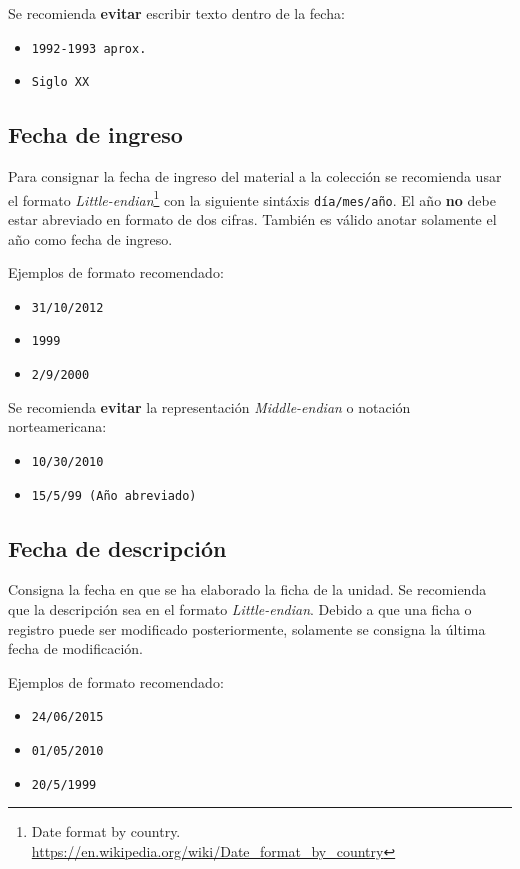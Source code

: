 \documentclass[10pt,letterpaper]{article}
\begin{document}
Se recomienda \textbf{evitar} escribir texto dentro de la fecha:
{\color{Red}
\begin{itemize}
	\item \texttt{1992-1993 aprox.}
	\item \texttt{Siglo XX}
\end{itemize}
}

\subsection{Fecha de ingreso}
Para consignar la fecha de ingreso del material a la colección se recomienda usar el formato \textit{Little-endian}\footnote{Date format by country. \url{https://en.wikipedia.org/wiki/Date_format_by_country}} con la siguiente sintáxis \verb|día/mes/año|. El año \textbf{no} debe estar abreviado en formato de dos cifras. También es válido anotar solamente el año como fecha de ingreso. 

Ejemplos de formato recomendado:
{\color{Blue}
\begin{itemize}
	\item \texttt{31/10/2012}
	\item \texttt{1999}
	\item \texttt{2/9/2000}
\end{itemize}
}

Se recomienda \textbf{evitar} la representación \textit{Middle-endian} o notación norteamericana:
{\color{Red}
\begin{itemize}
	\item \texttt{10/30/2010}
	\item \texttt{15/5/99 (Año abreviado)}
\end{itemize}
}

\subsection{Fecha de descripción}
Consigna la fecha en que se ha elaborado la ficha de la unidad. Se recomienda que la descripción sea en el formato \textit{Little-endian}. Debido a que una ficha o registro puede ser modificado posteriormente, solamente se consigna la última fecha de modificación.

Ejemplos de formato recomendado:
{\color{Blue}
\begin{itemize}
	\item \texttt{24/06/2015}
	\item \texttt{01/05/2010}
	\item \texttt{20/5/1999}
\end{itemize}
}
\end{document}
